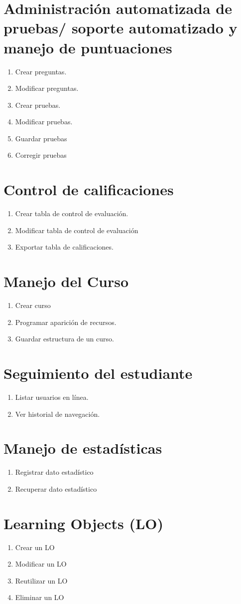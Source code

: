 \documentclass{article}
\begin{document}
\section{Administración automatizada de pruebas/ soporte automatizado y manejo de puntuaciones}
\begin{enumerate}
	\item Crear preguntas.
	\item Modificar preguntas.
	\item Crear pruebas.
	\item Modificar pruebas.
	\item Guardar pruebas
	\item Corregir pruebas
\end{enumerate}	

\section{Control de calificaciones}
\begin{enumerate}
	\item Crear tabla de control de evaluación.
	\item Modificar tabla de control de evaluación
	\item Exportar tabla de calificaciones.
\end{enumerate}

\section{Manejo del Curso}
\begin{enumerate}
	\item Crear curso
	\item Programar aparición de recursos.
	\item Guardar estructura de un curso.
\end{enumerate}

\section{Seguimiento del estudiante}
\begin{enumerate}
	\item Listar usuarios en línea.
	\item Ver historial de navegación.
\end{enumerate}

\section{Manejo de estadísticas}
\begin{enumerate}
	\item Registrar dato estadístico
	\item Recuperar dato estadístico
\end{enumerate}

\section{Learning Objects (LO)}
\begin{enumerate}
 \item Crear un LO 
 \item Modificar un LO
 \item Reutilizar un LO
 \item Eliminar un LO
\end{enumerate}
\end{document}
